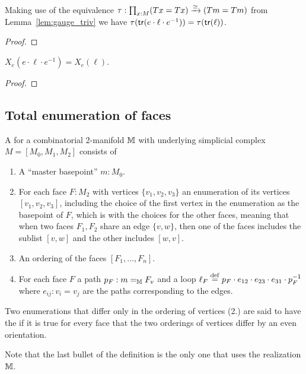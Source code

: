 \begin{mylemma}
Making use of the equivalence \( \tau:\prod_{x:M}(Tx=Tx)\xrightarrow[]{\simeq}(Tm=Tm) \) from Lemma~\ref{lem:gauge_triv} we have \( \tau(\mathsf{tr}(e\cdot\ell\cdot e^{-1}))=\tau(\mathsf{tr}(\ell)) \).
\end{mylemma}
\begin{proof}
\end{proof}

\begin{mylemma}
\(X_e(e\cdot\ell\cdot e^{-1}) = X_e(\ell)\).
\end{mylemma}
\begin{proof}
\end{proof}

\subsection{Total enumeration of faces}
\begin{mydef}
A  for a combinatorial 2-manifold \( \mathbb{M} \) with underlying simplicial complex \( M=[M_0, M_1, M_2] \) consists of
\begin{enumerate}
\item A ``master basepoint'' \( m:M_0 \).
\item For each face \( F:M_2 \) with vertices \( \{v_1, v_2, v_3\} \) an enumeration of its vertices \( [v_1, v_2, v_3] \), including the choice of the first vertex in the enumeration as the basepoint of \( F \), which is  with the choices for the other faces, meaning that when two faces \( F_1,F_2 \) share an edge \( \{v, w\} \), then one of the faces includes the sublist \( [v, w] \) and the other includes \( [w, v] \).
\item An ordering of the faces \( [F_1,\ldots,F_n] \).
\item For each face \( F \) a path \( p_F:m=_{\mathbb{M}} F_v \) and a loop \( \ell_F\stackrel{\mathrm{def}}{=} p_F\cdot e_{12}\cdot e_{23}\cdot e_{31}\cdot p_F^{-1} \) where \( e_{ij}:v_i=v_j \) are the paths corresponding to the edges. 
\end{enumerate}
Two enumerations that differ only in the ordering of vertices (2.) are said to have the  if it is true for every face that the two orderings of vertices differ by an even orientation.
\end{mydef}

Note that the last bullet of the definition is the only one that uses the realization \( \mathbb{M} \).


